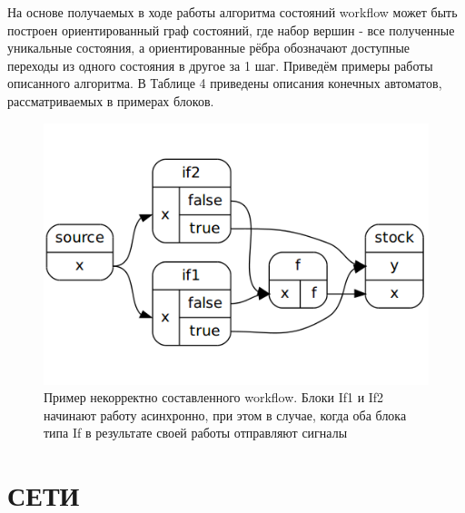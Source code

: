 \documentclass[koi8-r,usehyperref,12pt]{G7-32}
\begin{document}
На основе получаемых в ходе работы алгоритма состояний workflow может быть построен ориентированный граф состояний, где набор вершин - все полученные уникальные состояния, а ориентированные рёбра обозначают доступные переходы из одного состояния в другое за 1 шаг. Приведём примеры работы описанного алгоритма. В Таблице 4 приведены описания конечных автоматов, рассматриваемых в примерах блоков.



\begin{figure}
\centering
\includegraphics[scale=0.35]{race_workflow.png}
\caption{Пример некорректно составленного workflow. Блоки If1 и If2 начинают работу асинхронно, при этом в случае, когда оба блока типа If в результате своей работы отправляют сигналы }
\end{figure}




\section{СЕТИ}
\end{document}
